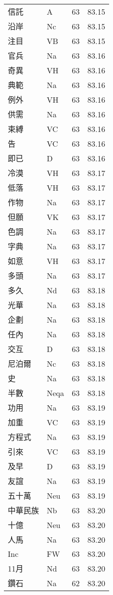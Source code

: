 \documentclass[twocolumn]{book}
\begin{document}
\begin{supertabular}{llrr}
信託 & A & 63 &  83.15\\
沿岸 & Nc & 63 &  83.15\\
注目 & VB & 63 &  83.15\\
官兵 & Na & 63 &  83.16\\
奇異 & VH & 63 &  83.16\\
典範 & Na & 63 &  83.16\\
例外 & VH & 63 &  83.16\\
供需 & Na & 63 &  83.16\\
束縛 & VC & 63 &  83.16\\
告 & VC & 63 &  83.16\\
即已 & D & 63 &  83.16\\
冷漠 & VH & 63 &  83.17\\
低落 & VH & 63 &  83.17\\
作物 & Na & 63 &  83.17\\
但願 & VK & 63 &  83.17\\
色調 & Na & 63 &  83.17\\
字典 & Na & 63 &  83.17\\
如意 & VH & 63 &  83.17\\
多頭 & Na & 63 &  83.17\\
多久 & Nd & 63 &  83.18\\
光華 & Na & 63 &  83.18\\
企劃 & Na & 63 &  83.18\\
任內 & Na & 63 &  83.18\\
交互 & D & 63 &  83.18\\
尼泊爾 & Nc & 63 &  83.18\\
史 & Na & 63 &  83.18\\
半數 & Neqa & 63 &  83.18\\
功用 & Na & 63 &  83.19\\
加重 & VC & 63 &  83.19\\
方程式 & Na & 63 &  83.19\\
引來 & VC & 63 &  83.19\\
及早 & D & 63 &  83.19\\
友誼 & Na & 63 &  83.19\\
五十萬 & Neu & 63 &  83.19\\
中華民族 & Nb & 63 &  83.20\\
十億 & Neu & 63 &  83.20\\
人馬 & Na & 63 &  83.20\\
Inc & FW & 63 &  83.20\\
11月 & Nd & 63 &  83.20\\
鑽石 & Na & 62 &  83.20\\

\end{supertabular}
\end{document}
